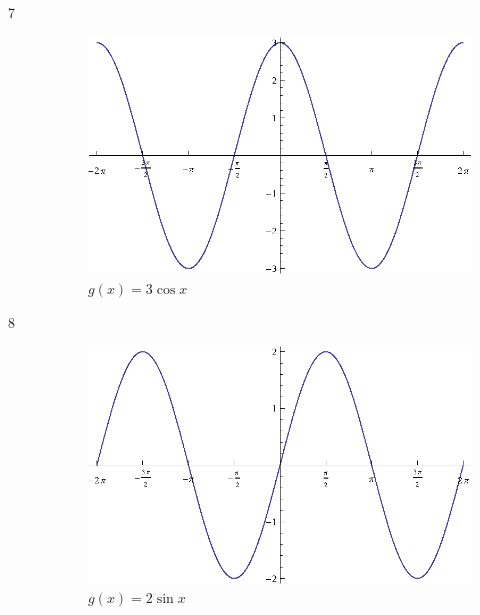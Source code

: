 \documentclass{exam}
\begin{document}
\begin{description}
      \item[7]
        \begin{figure}[H]
          \centering
          \includegraphics[scale=0.8]{exercise07.eps}
          \caption{$g(x) = 3 \cos x$}
        \end{figure}

      \item[8]
        \begin{figure}[H]
          \centering
          \includegraphics[scale=0.8]{exercise08.eps}
          \caption{$g(x) = 2 \sin x$}
        \end{figure}


\end{description}
\end{document}
